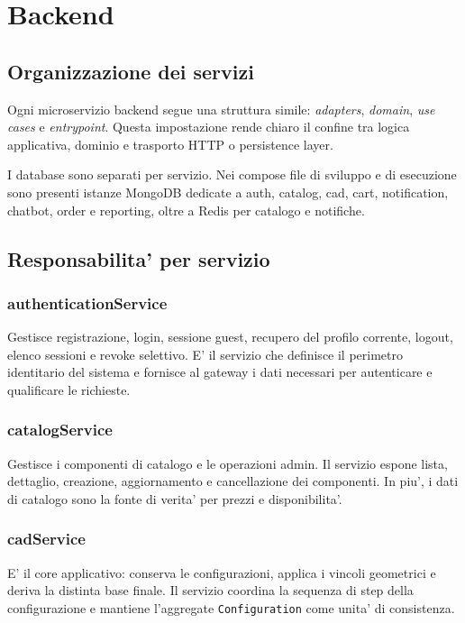 \chapter{Backend}

\section{Organizzazione dei servizi}

Ogni microservizio backend segue una struttura simile: \emph{adapters}, \emph{domain}, \emph{use cases} e \emph{entrypoint}. Questa impostazione rende chiaro il confine tra logica applicativa, dominio e trasporto HTTP o persistence layer.

I database sono separati per servizio. Nei compose file di sviluppo e di esecuzione sono presenti istanze MongoDB dedicate a auth, catalog, cad, cart, notification, chatbot, order e reporting, oltre a Redis per catalogo e notifiche.

\section{Responsabilita' per servizio}

\subsection{authenticationService}
Gestisce registrazione, login, sessione guest, recupero del profilo corrente, logout, elenco sessioni e revoke selettivo. E' il servizio che definisce il perimetro identitario del sistema e fornisce al gateway i dati necessari per autenticare e qualificare le richieste.

\subsection{catalogService}
Gestisce i componenti di catalogo e le operazioni admin. Il servizio espone lista, dettaglio, creazione, aggiornamento e cancellazione dei componenti. In piu', i dati di catalogo sono la fonte di verita' per prezzi e disponibilita'.

\subsection{cadService}
E' il core applicativo: conserva le configurazioni, applica i vincoli geometrici e deriva la distinta base finale. Il servizio coordina la sequenza di step della configurazione e mantiene l'aggregate \texttt{Configuration} come unita' di consistenza.

